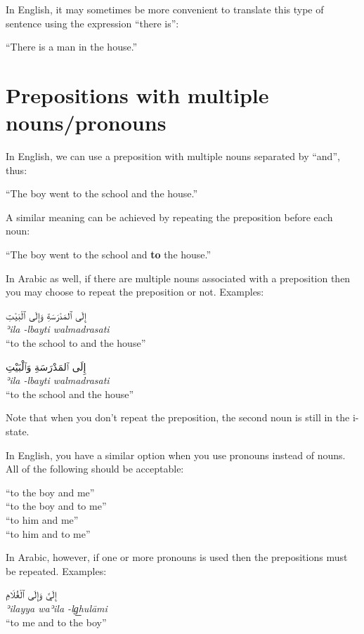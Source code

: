 \documentclass[
  10pt,
]{book}
\begin{document}
In English, it may sometimes be more convenient to translate this type of sentence using the expression \enquote{there is}:

\enquote{There is a man in the house.}

\section{Prepositions with multiple nouns/pronouns}\label{prepositions-with-multiple-nounspronouns}

In English, we can use a preposition with multiple nouns separated by \enquote{and}, thus:

\enquote{The boy went to the school and the house.}

A similar meaning can be achieved by repeating the preposition before each noun:

\enquote{The boy went to the school and \textbf{to} the house.}

In Arabic as well, if there are multiple nouns associated with a preposition then you may choose to repeat the preposition or not. Examples:

\foreignlanguage{arabic}{إِلَى ٱلمَدْرَسَةِ وَإِلَى ٱلْبَيْتِ}\\
\emph{ʾila -lbayti walmadrasati}\\
\enquote{to the school to and the house}

\foreignlanguage{arabic}{إِلَى ٱلمَدْرَسَةِ وَٱلْبَيْتِ}\\
\emph{ʾila -lbayti walmadrasati}\\
\enquote{to the school and the house}

Note that when you don't repeat the preposition, the second noun is still in the i-state.

In English, you have a similar option when you use pronouns instead of nouns. All of the following should be acceptable:

\enquote{to the boy and me}\\
\enquote{to the boy and to me}\\
\enquote{to him and me}\\
\enquote{to him and to me}

In Arabic, however, if one or more pronouns is used then the prepositions must be repeated. Examples:

\foreignlanguage{arabic}{إِلَيَّ وَإِلَى ٱلْغُلَامِ}\\
\emph{ʾilayya waʾila -lg͟hulāmi}\\
\enquote{to me and to the boy}
\end{document}
